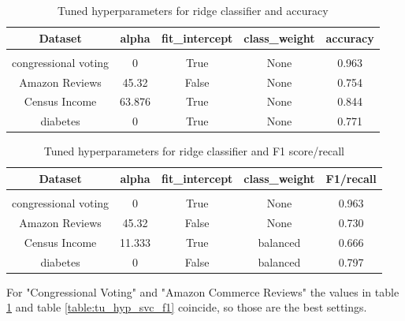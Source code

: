 \documentclass[a4paper,10pt]{article}
\begin{document}
\begin{table}[h!]
    \centering
    \begin{tabular}{|c|c|c|c|c|}
    \hline
    Dataset & \textsf{alpha} & \textsf{fit\_intercept} &  \textsf{class\_weight} &  accuracy \\
    \hline
    \multicolumn{5}{c}{\vspace{-0.4cm}} \\ %
    \hline
    congressional voting & 0 & True & None & 0.963 \\%
    \hline
    Amazon Reviews & 45.32 & False & None &  0.754 \\%
    \hline
    Census Income & 63.876 & True & None &  0.844 \\%
    \hline
    diabetes & 0 & True & None &  0.771 \\%
    \hline
    \end{tabular}
    \caption{Tuned hyperparameters for ridge classifier and accuracy} 
    \label{table:tu_hyp_ridge_ac}
    \end{table}

\begin{table}[h!]
    \centering
    \begin{tabular}{|c|c|c|c|c|}
    \hline
    Dataset & \textsf{alpha} & \textsf{fit\_intercept} &  \textsf{class\_weight} & F1/recall \\
    \hline
    \multicolumn{5}{c}{\vspace{-0.4cm}} \\ %
    \hline
    congressional voting & 0 & True & None & 0.963 \\%
    \hline
    Amazon Reviews & 45.32 & False & None &  0.730 \\%
    \hline
    Census Income & 11.333 & True & balanced & 0.666 \\%
    \hline
    diabetes & 0 & False & balanced & 0.797 \\%
    \hline
    \end{tabular}
    \caption{Tuned hyperparameters for ridge classifier and F1 score/recall} 
    \label{table:tu_hyp_ridge_f1}
    \end{table}

For "Congressional Voting" and "Amazon Commerce Reviews" the values in table \ref{table:tu_hyp_ridge_ac} and table \ref{table:tu_hyp_svc_f1} coincide, so those are the best settings. 
\end{document}
